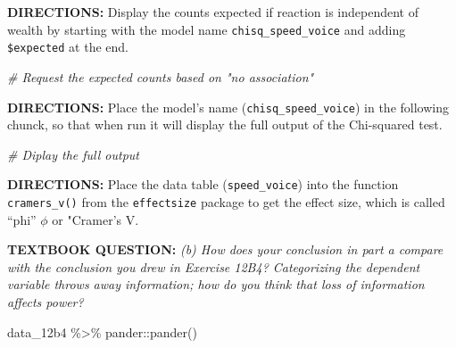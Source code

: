 \documentclass[
]{article}
\newenvironment{Shaded}{\begin{snugshade}}{\end{snugshade}}
\newcommand{\CommentTok}[1]{\textcolor[rgb]{0.56,0.35,0.01}{\textit{#1}}}
\newcommand{\FunctionTok}[1]{\textcolor[rgb]{0.00,0.00,0.00}{#1}}
\newcommand{\NormalTok}[1]{#1}
\newcommand{\SpecialCharTok}[1]{\textcolor[rgb]{0.00,0.00,0.00}{#1}}
\begin{document}
\textbf{DIRECTIONS:} Display the counts expected if reaction is
independent of wealth by starting with the model name
\texttt{chisq\_speed\_voice} and adding \texttt{\$expected} at the end.

\begin{Shaded}
\begin{Highlighting}[]
\CommentTok{\# Request the expected counts based on "no association"}
\end{Highlighting}
\end{Shaded}

\textbf{DIRECTIONS:} Place the model's name
(\texttt{chisq\_speed\_voice}) in the following chunck, so that when run
it will display the full output of the Chi-squared test.

\begin{Shaded}
\begin{Highlighting}[]
\CommentTok{\# Diplay the full output}
\end{Highlighting}
\end{Shaded}

\textbf{DIRECTIONS:} Place the data table (\texttt{speed\_voice}) into
the function \texttt{cramers\_v()} from the \texttt{effectsize} package
to get the effect size, which is called ``phi'' \(\phi\) or "Cramer's V.

\clearpage

\textbf{TEXTBOOK QUESTION:} \emph{(b) How does your conclusion in part a
compare with the conclusion you drew in Exercise 12B4? Categorizing the
dependent variable throws away information; how do you think that loss
of information affects power?}

\begin{Shaded}
\begin{Highlighting}[]
\NormalTok{data\_12b4 }\SpecialCharTok{\%\textgreater{}\%} 
\NormalTok{  pander}\SpecialCharTok{::}\FunctionTok{pander}\NormalTok{()}
\end{Highlighting}
\end{Shaded}
\end{document}

